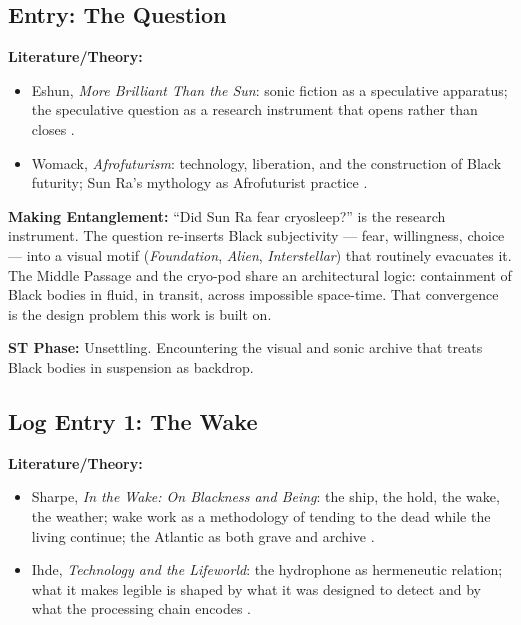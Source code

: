\medskip

\subsection*{Entry: The Question}

\noindent\textbf{Literature/Theory:}
\begin{itemize}[noitemsep]
    \item Eshun, \textit{More Brilliant Than the Sun}: sonic fiction as a speculative apparatus; the speculative question as a research instrument that opens rather than closes \parencite{Eshun_1999}.
    \item Womack, \textit{Afrofuturism}: technology, liberation, and the construction of Black futurity; Sun Ra's mythology as Afrofuturist practice \parencite{Womack_2013}.
\end{itemize}

\noindent\textbf{Making Entanglement:} ``Did Sun Ra fear cryosleep?'' is the research instrument. The question re-inserts Black subjectivity — fear, willingness, choice — into a visual motif (\textit{Foundation}, \textit{Alien}, \textit{Interstellar}) that routinely evacuates it. The Middle Passage and the cryo-pod share an architectural logic: containment of Black bodies in fluid, in transit, across impossible space-time. That convergence is the design problem this work is built on.

\noindent\textbf{ST Phase:} Unsettling. Encountering the visual and sonic archive that treats Black bodies in suspension as backdrop.

\medskip

\subsection*{Log Entry 1: The Wake}

\noindent\textbf{Literature/Theory:}
\begin{itemize}[noitemsep]
    \item Sharpe, \textit{In the Wake: On Blackness and Being}: the ship, the hold, the wake, the weather; wake work as a methodology of tending to the dead while the living continue; the Atlantic as both grave and archive \parencite{Sharpe_2016}.
    \item Ihde, \textit{Technology and the Lifeworld}: the hydrophone as hermeneutic relation; what it makes legible is shaped by what it was designed to detect and by what the processing chain encodes \parencite{Ihde_1990}.
\end{itemize}

